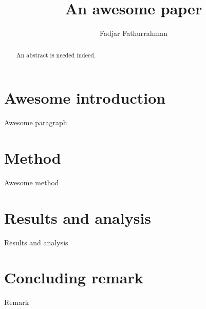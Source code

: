 \documentclass[%
reprint,
amsmath,
amssymb,
aps,
]{revtex4-1}
\begin{document}
\title{An awesome paper}
\author{Fadjar Fathurrahman}

\begin{abstract}
An abstract is needed indeed.
\end{abstract}

\maketitle

\section{Awesome introduction}

Awesome paragraph

\section{Method}

Awesome method

\section{Results and analysis}

Results and analysis

\section{Concluding remark}

Remark
\end{document}
